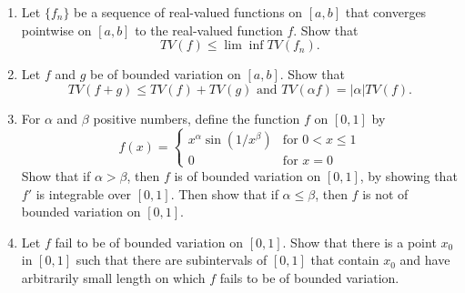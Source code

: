 \begin{enumerate}
    \item Let $\{f_n\}$ be a sequence of real-valued functions on $[a,b]$ that converges pointwise on $[a,b]$ to the real-valued function $f$. Show that 
    \[
        TV(f)\le\lim\inf TV(f_n).  
    \]
    \item Let $f$ and $g$ be of bounded variation on $[a,b]$. Show that 
    \[
        TV(f+g)\le TV(f)+TV(g)\text{ and }TV(\alpha f)=|\alpha|TV(f).
    \]
    \item For $\alpha$ and $\beta$ positive numbers, define the function $f$ on $[0,1]$ by
    \[
        f(x)=
        \begin{cases}
            x^\alpha\sin(1/x^\beta)&\text{for }0<x\le1\\
            0&\text{for }x=0
        \end{cases}    
    \]
    Show that if $\alpha>\beta$, then $f$ is of bounded variation on $[0,1]$, by showing that $f'$ is integrable over $[0,1]$. Then show that if $\alpha\le\beta$, then $f$ is not of bounded variation on $[0,1]$.
    \item Let $f$ fail to be of bounded variation on $[0,1]$. Show that there is a point $x_0$ in $[0,1]$ such that there are subintervals of $[0,1]$ that contain $x_0$ and have arbitrarily small length on which $f$ fails to be of bounded variation.
\end{enumerate}

